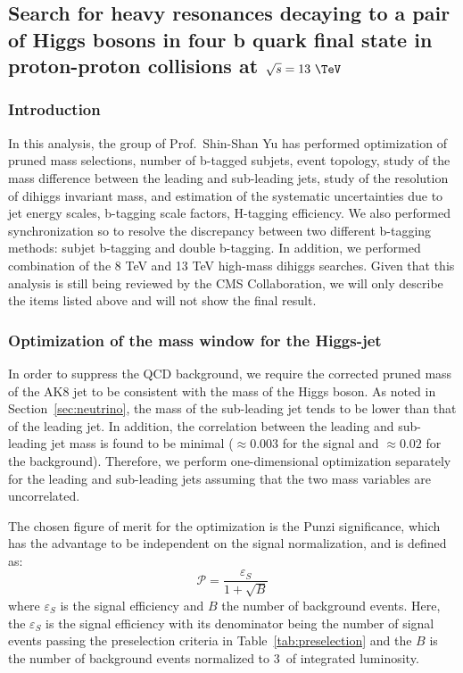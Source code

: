 \subsection{Search for heavy resonances decaying to a pair of Higgs bosons in four b quark final state in proton-proton collisions at $\sqrt{s}=13~\TeV$\label{sec:dihiggs}}

\subsubsection*{Introduction}
In this analysis, the group of Prof.~Shin-Shan Yu has performed optimization of pruned mass selections, number of b-tagged subjets, event topology, study of the 
mass difference between the leading and sub-leading jets, study of the resolution of dihiggs invariant mass, 
and estimation of the systematic uncertainties due to jet energy scales, b-tagging scale factors, H-tagging efficiency. 
We also performed synchronization so to resolve 
the discrepancy between two different b-tagging methods: subjet b-tagging and double b-tagging. In addition, we performed combination of the 8 TeV and 13 TeV high-mass 
dihiggs searches. Given that this analysis is still being reviewed by the CMS Collaboration, we will only describe the items listed above and will not show the final result.


\subsubsection*{Optimization of the mass window for the Higgs-jet}
In order to suppress the QCD background, we require the 
corrected pruned mass of the AK8 jet to be consistent with the mass of 
the Higgs boson. As noted in Section~\ref{sec:neutrino}, the mass of the 
sub-leading jet tends to be lower than that of the leading jet. In addition,  
the correlation between the leading and sub-leading jet mass is found 
to be minimal ($\approx 0.003$ for the signal and $\approx 0.02$ for the 
background). Therefore, we perform one-dimensional optimization separately 
for the leading and sub-leading jets assuming that the two mass variables 
are uncorrelated.  

The chosen figure of merit for the optimization is the Punzi significance, 
which has the advantage to be independent on the signal normalization, and is 
defined as:$$\mathcal{P} = \frac{\varepsilon_S}{1+\sqrt{B}}$$ where 
$\varepsilon_S$ is the signal efficiency and $B$ the number of background 
events. 
Here, the $\varepsilon_S$ is the signal efficiency with its 
denominator being the number of signal events passing the preselection 
criteria in Table~\ref{tab:preselection} and the $B$ is the number of 
background events normalized to 3~\fbinv of integrated luminosity. 

